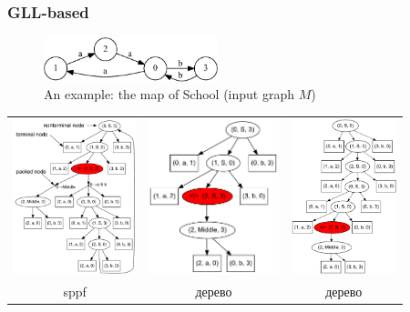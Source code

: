 \documentclass{beamer}
\begin{document}
\begin{frame}
  \transwipe[direction=90]
  \frametitle{GLL-based}
\begin{figure}[ht]
    \centering
        \includegraphics[width=0.45\textwidth]{pictures/input.pdf}
        \caption{An example: the map of School (input graph $M$)}
\end{figure}

\begin{tabular}{  c  c  c  }
      \includegraphics[height=4.5cm]{pictures/AnBn.pdf}
    &
      \includegraphics[height=4.5cm]{pictures/AnBn_2.pdf}
    &
      \includegraphics[height=4.5cm]{pictures/AnBn_1.pdf}

\\
sppf
& дерево
& дерево
  \end{tabular}
\end{frame}
\end{document}
